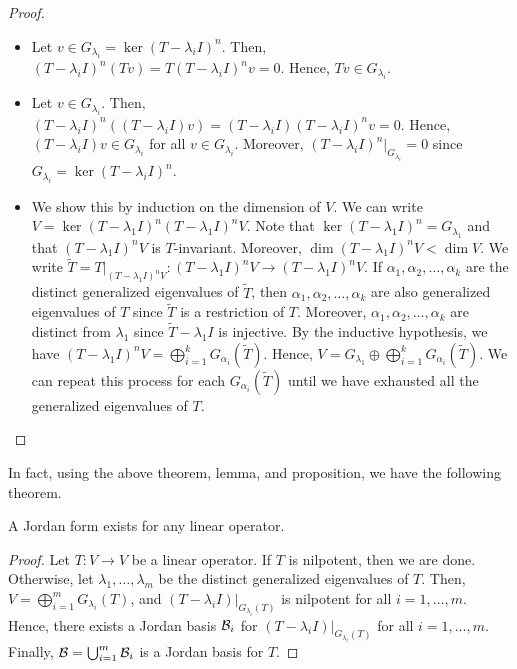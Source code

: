 \begin{proof}
    \begin{itemize}
        \item Let $v \in G_{\lambda_{i}} = \ker (T-\lambda_{i} I)^{n}$. Then, $(T-\lambda_{i}I)^{n} (Tv) = T(T-\lambda_{i}I)^{n} v = 0$. Hence, $Tv \in G_{\lambda_{i}}$.
        \item Let $v \in G_{\lambda_{i}}$. Then, $(T-\lambda_{i}I)^{n} ((T-\lambda_{i}I) v) = (T-\lambda_{i}I) (T-\lambda_{i}I)^{n} v = 0$. Hence, $(T-\lambda_{i}I) v \in G_{\lambda_{i}}$ for all $v \in G_{\lambda_{i}}$. Moreover, $(T-\lambda_{i}I)^{n} \big|_{G_{\lambda_{i}}} = 0$ since $G_{\lambda_{i}} = \ker (T-\lambda_{i}I)^{n}$.
        \item We show this by induction on the dimension of $V$. We can write $V = \ker(T-\lambda_{1}I)^{n} (T-\lambda_{1}I)^{n}V$. Note that $\ker(T-\lambda_{1}I)^{n} = G_{\lambda_{1}}$ and that $(T-\lambda_{1}I)^{n}V$ is $T$-invariant. Moreover, $\dim (T-\lambda_{1}I)^{n}V < \dim V$. We write $\tilde{T} = T|_{(T-\lambda_{1}I)^{n}V} : (T-\lambda_{1}I)^{n}V \to (T-\lambda_{1}I)^{n}V$. If $\alpha_{1},\alpha_{2},\ldots,\alpha_{k}$ are the distinct generalized eigenvalues of $\tilde{T}$, then $\alpha_{1},\alpha_{2},\ldots,\alpha_{k}$ are also generalized eigenvalues of $T$ since $\tilde{T}$ is a restriction of $T$. Moreover, $\alpha_{1},\alpha_{2},\ldots,\alpha_{k}$ are distinct from $\lambda_{1}$ since $\tilde{T} - \lambda_{1}I$ is injective. By the inductive hypothesis, we have $(T-\lambda_{1}I)^{n}V = \bigoplus_{i=1}^{k} G_{\alpha_{i}}(\tilde{T})$. Hence, $V = G_{\lambda_{1}} \oplus \bigoplus_{i=1}^{k} G_{\alpha_{i}}(\tilde{T})$. We can repeat this process for each $G_{\alpha_{i}}(\tilde{T})$ until we have exhausted all the generalized eigenvalues of $T$.
    \end{itemize}
\end{proof}

In fact, using the above theorem, lemma, and proposition, we have the following theorem.

\begin{theorem}
    A Jordan form exists for any linear operator.
\end{theorem}
\begin{proof}
    Let $T:V \to V$ be a linear operator. If $T$ is nilpotent, then we are done. Otherwise, let $\lambda_{1},\ldots,\lambda_{m}$ be the distinct generalized eigenvalues of $T$. Then, $V = \bigoplus_{i=1}^{m} G_{\lambda_{i}}(T)$, and $(T-\lambda_{i}I) \big|_{G_{\lambda_{i}}(T)}$ is nilpotent for all $i = 1,\ldots,m$. Hence, there exists a Jordan basis $\mathcal{B}_{i}$ for $(T-\lambda_{i}I) \big|_{G_{\lambda_{i}}(T)}$ for all $i = 1,\ldots,m$. Finally, $\mathcal{B} = \bigcup_{i=1}^{m} \mathcal{B}_{i}$ is a Jordan basis for $T$.
\end{proof}

